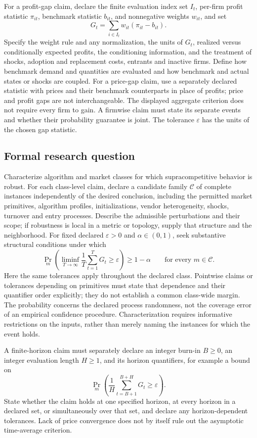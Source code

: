 \documentclass[11pt,a4paper]{article}
\begin{document}
For a profit-gap claim, declare the finite evaluation index set $I_t$, per-firm profit statistic $\pi_{it}$, benchmark statistic $b_{it}$, and nonnegative weights $w_{it}$, and set
\[
G_t=\sum_{i\in I_t}w_{it}(\pi_{it}-b_{it}).
\]
Specify the weight rule and any normalization, the units of $G_t$, realized versus conditionally expected profits, the conditioning information, and the treatment of shocks, adoption and replacement costs, entrants and inactive firms. Define how benchmark demand and quantities are evaluated and how benchmark and actual states or shocks are coupled. For a price-gap claim, use a separately declared statistic with prices and their benchmark counterparts in place of profits; price and profit gaps are not interchangeable. The displayed aggregate criterion does not require every firm to gain. A firmwise claim must state its separate events and whether their probability guarantee is joint. The tolerance $\varepsilon$ has the units of the chosen gap statistic.

\subsection*{Formal research question}

Characterize algorithm and market classes for which supracompetitive behavior is robust. For each class-level claim, declare a candidate family $\mathcal C$ of complete instances independently of the desired conclusion, including the permitted market primitives, algorithm profiles, initializations, vendor heterogeneity, shocks, turnover and entry processes. Describe the admissible perturbations and their scope; if robustness is local in a metric or topology, supply that structure and the neighborhood. For fixed declared $\varepsilon>0$ and $\alpha\in(0,1)$, seek substantive structural conditions under which
\[
\Pr_m\!\left(\liminf_{T\to\infty}\frac1T\sum_{t=1}^TG_t\geq\varepsilon\right)\geq1-\alpha
\qquad\text{for every }m\in\mathcal C.
\]
Here the same tolerances apply throughout the declared class. Pointwise claims or tolerances depending on primitives must state that dependence and their quantifier order explicitly; they do not establish a common class-wide margin. The probability concerns the declared process randomness, not the coverage error of an empirical confidence procedure. Characterization requires informative restrictions on the inputs, rather than merely naming the instances for which the event holds.

A finite-horizon claim must separately declare an integer burn-in $B\geq0$, an integer evaluation length $H\geq1$, and its horizon quantifiers, for example a bound on
\[
\Pr_m\!\left(\frac1H\sum_{t=B+1}^{B+H}G_t\geq\varepsilon\right).
\]
State whether the claim holds at one specified horizon, at every horizon in a declared set, or simultaneously over that set, and declare any horizon-dependent tolerances. Lack of price convergence does not by itself rule out the asymptotic time-average criterion.
\end{document}

